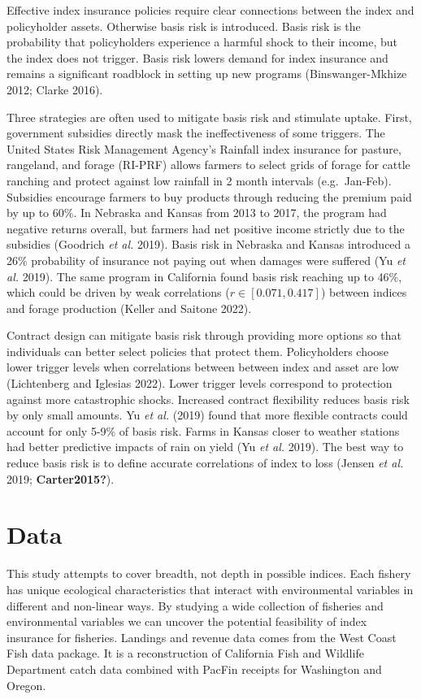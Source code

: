 \documentclass[
  letterpaper,
  DIV=11,
  numbers=noendperiod]{scrartcl}
\begin{document}
Effective index insurance policies require clear connections between the
index and policyholder assets. Otherwise basis risk is introduced. Basis
risk is the probability that policyholders experience a harmful shock to
their income, but the index does not trigger. Basis risk lowers demand
for index insurance and remains a significant roadblock in setting up
new programs (Binswanger-Mkhize 2012; Clarke 2016).

Three strategies are often used to mitigate basis risk and stimulate
uptake. First, government subsidies directly mask the ineffectiveness of
some triggers. The United States Risk Management Agency's Rainfall index
insurance for pasture, rangeland, and forage (RI-PRF) allows farmers to
select grids of forage for cattle ranching and protect against low
rainfall in 2 month intervals (e.g.~Jan-Feb). Subsidies encourage
farmers to buy products through reducing the premium paid by up to 60\%.
In Nebraska and Kansas from 2013 to 2017, the program had negative
returns overall, but farmers had net positive income strictly due to the
subsidies (Goodrich \emph{et al.} 2019). Basis risk in Nebraska and
Kansas introduced a 26\% probability of insurance not paying out when
damages were suffered (Yu \emph{et al.} 2019). The same program in
California found basis risk reaching up to 46\%, which could be driven
by weak correlations (\(r \in[0.071,0.417]\)) between indices and forage
production (Keller and Saitone 2022).

Contract design can mitigate basis risk through providing more options
so that individuals can better select policies that protect them.
Policyholders choose lower trigger levels when correlations between
between index and asset are low (Lichtenberg and Iglesias 2022). Lower
trigger levels correspond to protection against more catastrophic
shocks. Increased contract flexibility reduces basis risk by only small
amounts. Yu \emph{et al.} (2019) found that more flexible contracts
could account for only 5-9\% of basis risk. Farms in Kansas closer to
weather stations had better predictive impacts of rain on yield (Yu
\emph{et al.} 2019). The best way to reduce basis risk is to define
accurate correlations of index to loss (Jensen \emph{et al.} 2019;
\textbf{Carter2015?}).

\hypertarget{data}{%
\section{Data}\label{data}}

This study attempts to cover breadth, not depth in possible indices.
Each fishery has unique ecological characteristics that interact with
environmental variables in different and non-linear ways. By studying a
wide collection of fisheries and environmental variables we can uncover
the potential feasibility of index insurance for fisheries. Landings and
revenue data comes from the West Coast Fish data package. It is a
reconstruction of California Fish and Wildlife Department catch data
combined with PacFin receipts for Washington and Oregon.
\end{document}
